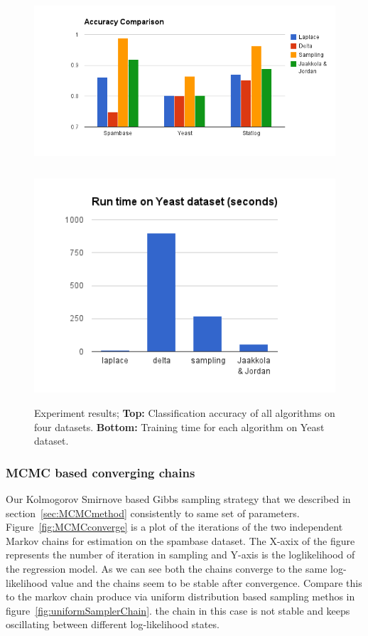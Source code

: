 \begin{figure}[t]
\centering
\includegraphics[height=7.0cm]{results/accuracy_comp.png}
\includegraphics[height=8.0cm]{results/speed_comp.png}

\caption{\small Experiment results; {\bf Top:} Classification accuracy of all algorithms on
four datasets. {\bf Bottom:} Training time for each algorithm on Yeast dataset. }
\label{fig:results}
\end{figure}

\subsubsection{MCMC based converging chains}
Our Kolmogorov Smirnove based Gibbs sampling strategy that we described in
section~\ref{sec:MCMCmethod} consistently to same set of parameters.
Figure~\ref{fig:MCMCconverge} is a plot of the iterations of the two
independent Markov chains for estimation on the spambase dataset. 
The X-axix of the figure represents the number of
iteration in sampling and Y-axis is the loglikelihood of the regression model.
As we can see both the chains converge to the same log-likelihood value and the
chains seem to be stable after convergence. Compare this to the markov chain
produce via uniform distribution based sampling methos in
figure~\ref{fig:uniformSamplerChain}. the chain in this case is not stable and
keeps oscillating between different log-likelihood states. 
 

